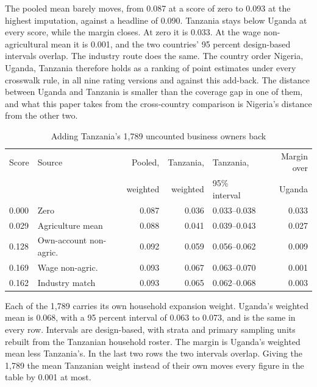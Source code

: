 The pooled mean barely moves, from 0.087 at a score of zero
to 0.093 at the highest imputation, against a headline of 0.090. Tanzania
stays below Uganda at every score, while the margin closes. At zero it is 0.033.
At the wage non-agricultural mean it is 0.001, and the two countries' 95 percent
design-based intervals overlap. The industry route does the same.
The country order Nigeria, Uganda, Tanzania therefore holds as a ranking of
point estimates under every crosswalk rule, in all nine rating versions and
against this add-back. The distance between Uganda and Tanzania is smaller
than the coverage gap in one of them, and what this paper takes from the
cross-country comparison is Nigeria's distance from the other two.

\begin{table}[ht]
\centering
\caption{Adding Tanzania's 1,789 uncounted business owners back}
\label{tab:addback}
\footnotesize
\begin{tabular}{llrrlr}
\toprule
Score & Source & Pooled, & Tanzania, & Tanzania, & Margin over \\
      &        & weighted & weighted & 95\% interval & Uganda \\
\midrule
0.000 & Zero                      & 0.087 & 0.036 & 0.033--0.038 & 0.033 \\
0.029 & Agriculture mean          & 0.088 & 0.041 & 0.039--0.043 & 0.027 \\
0.128 & Own-account non-agric.    & 0.092 & 0.059 & 0.056--0.062 & 0.009 \\
0.169 & Wage non-agric.           & 0.093 & 0.067 & 0.063--0.070 & 0.001 \\
0.162 & Industry match            & 0.093 & 0.065 & 0.062--0.068 & 0.003 \\
\bottomrule
\end{tabular}

\vspace{4pt}
\begin{minipage}{0.94\linewidth}
\footnotesize
Each of the 1,789 carries its own household expansion weight. Uganda's weighted
mean is 0.068, with a 95 percent interval of 0.063 to 0.073, and is the same in
every row. Intervals are design-based, with strata and primary sampling units
rebuilt from the Tanzanian household roster. The margin is Uganda's weighted
mean less Tanzania's. In the last two rows the two intervals overlap. Giving
the 1,789 the mean Tanzanian weight instead of their own moves every figure in
the table by 0.001 at most.
\end{minipage}
\end{table}

